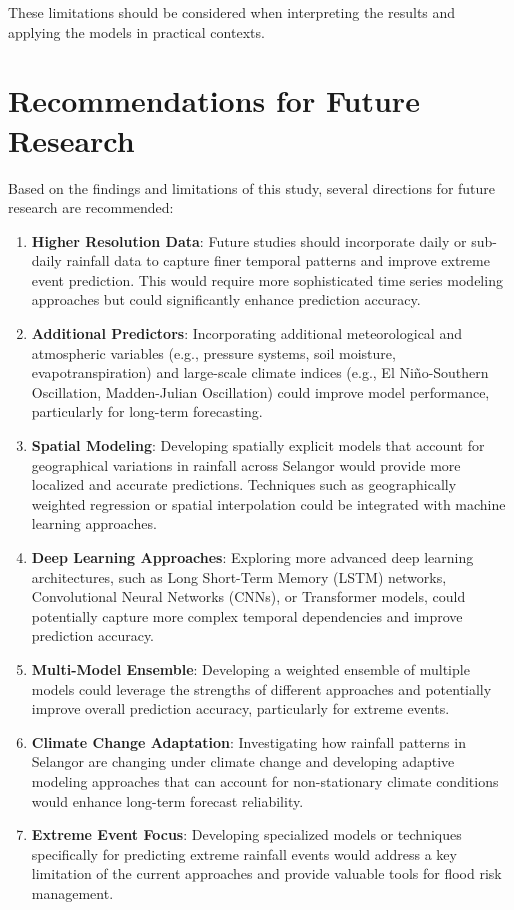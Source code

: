 \documentclass[12pt]{article}
\begin{document}
These limitations should be considered when interpreting the results and applying the models in practical contexts.

\section{Recommendations for Future Research}
\label{sec:future_research}

Based on the findings and limitations of this study, several directions for future research are recommended:

\begin{enumerate}
    \item \textbf{Higher Resolution Data}: Future studies should incorporate daily or sub-daily rainfall data to capture finer temporal patterns and improve extreme event prediction. This would require more sophisticated time series modeling approaches but could significantly enhance prediction accuracy.
    
    \item \textbf{Additional Predictors}: Incorporating additional meteorological and atmospheric variables (e.g., pressure systems, soil moisture, evapotranspiration) and large-scale climate indices (e.g., El Niño-Southern Oscillation, Madden-Julian Oscillation) could improve model performance, particularly for long-term forecasting.
    
    \item \textbf{Spatial Modeling}: Developing spatially explicit models that account for geographical variations in rainfall across Selangor would provide more localized and accurate predictions. Techniques such as geographically weighted regression or spatial interpolation could be integrated with machine learning approaches.
    
    \item \textbf{Deep Learning Approaches}: Exploring more advanced deep learning architectures, such as Long Short-Term Memory (LSTM) networks, Convolutional Neural Networks (CNNs), or Transformer models, could potentially capture more complex temporal dependencies and improve prediction accuracy.
    
    \item \textbf{Multi-Model Ensemble}: Developing a weighted ensemble of multiple models could leverage the strengths of different approaches and potentially improve overall prediction accuracy, particularly for extreme events.
    
    \item \textbf{Climate Change Adaptation}: Investigating how rainfall patterns in Selangor are changing under climate change and developing adaptive modeling approaches that can account for non-stationary climate conditions would enhance long-term forecast reliability.
    
    \item \textbf{Extreme Event Focus}: Developing specialized models or techniques specifically for predicting extreme rainfall events would address a key limitation of the current approaches and provide valuable tools for flood risk management.
\end{enumerate}
\end{document}
